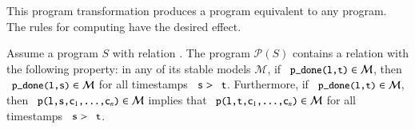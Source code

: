 This program transformation produces a \slang program equivalent to any \plang program.  The rules for computing  have the desired effect.
\begin{lemma}[Sealing]
\label{lem:plang-done-right}
Assume a \plang program $S$ with relation .  The \lang program $\mathcal{P}(S)$ contains a relation  with the following property: in any of its stable models $\mathcal{M}$, if $\dedalus{p_done(l,t)} \in \mathcal{M}$,  then $\dedalus{p_done(l,s)} \in \mathcal{M}$ for all timestamps $\dedalus{s} > \dedalus{t}$.  Furthermore, if $\dedalus{p_done(l,t)} \in \mathcal{M}$, then $\dedalus{p(l,s,c\sub{1},\ldots,c\sub{n})} \in \mathcal{M}$ implies that $\dedalus{p(l,t,c\sub{1},\ldots,c\sub{n})} \in \mathcal{M}$ for all timestamps $\dedalus{s} > \dedalus{t}$.
\end{lemma}





